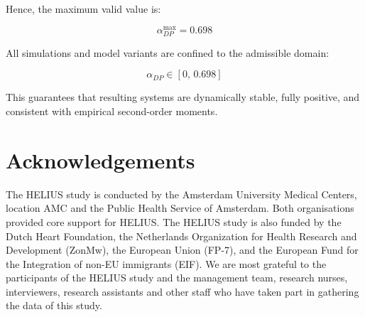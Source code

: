\documentclass[
]{article}
\begin{document}
Hence, the maximum valid value is:

\[
\boxed{\alpha_{DP}^{\max} = 0.698}
\]

All simulations and model variants are confined to the admissible
domain:

\[
\alpha_{DP} \in [0,\, 0.698]
\]

This guarantees that resulting systems are dynamically stable, fully
positive, and consistent with empirical second-order moments.

\section*{Acknowledgements}\label{acknowledgements}

The HELIUS study is conducted by the Amsterdam University Medical
Centers, location AMC and the Public Health Service of Amsterdam. Both
organisations provided core support for HELIUS. The HELIUS study is also
funded by the Dutch Heart Foundation, the Netherlands Organization for
Health Research and Development (ZonMw), the European Union (FP-7), and
the European Fund for the Integration of non-EU immigrants (EIF). We are
most grateful to the participants of the HELIUS study and the management
team, research nurses, interviewers, research assistants and other staff
who have taken part in gathering the data of this study.
\end{document}
